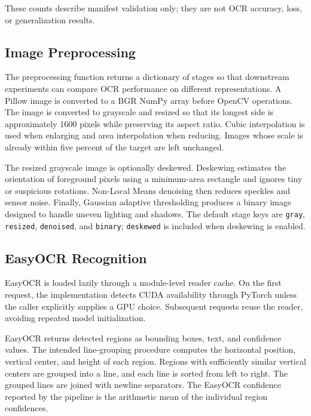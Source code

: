 \documentclass[conference]{IEEEtran}
\begin{document}
These counts describe manifest validation only; they are not OCR accuracy,
loss, or generalization results.

\subsection{Image Preprocessing}
\label{sec:preprocessing}

The preprocessing function returns a dictionary of stages so that downstream
experiments can compare OCR performance on different representations. A
Pillow image is converted to a BGR NumPy array before OpenCV operations.
The image is converted to grayscale and resized so that its longest side is
approximately 1600 pixels while preserving its aspect ratio. Cubic
interpolation is used when enlarging and area interpolation when reducing.
Images whose scale is already within five percent of the target are left
unchanged.

The resized grayscale image is optionally deskewed. Deskewing estimates the
orientation of foreground pixels using a minimum-area rectangle and ignores
tiny or suspicious rotations. Non-Local Means denoising then reduces speckles
and sensor noise. Finally, Gaussian adaptive thresholding produces a binary
image designed to handle uneven lighting and shadows. The default stage keys
are \texttt{gray}, \texttt{resized}, \texttt{denoised}, and \texttt{binary};
\texttt{deskewed} is included when deskewing is enabled.

\subsection{EasyOCR Recognition}
\label{sec:easyocr}

EasyOCR is loaded lazily through a module-level reader cache. On the first
request, the implementation detects CUDA availability through PyTorch unless
the caller explicitly supplies a GPU choice. Subsequent requests reuse the
reader, avoiding repeated model initialization.

EasyOCR returns detected regions as bounding boxes, text, and confidence
values. The intended line-grouping procedure computes the horizontal position,
vertical center, and height of each region. Regions with sufficiently similar
vertical centers are grouped into a line, and each line is sorted from left to
right. The grouped lines are joined with newline separators. The EasyOCR
confidence reported by the pipeline is the arithmetic mean of the individual
region confidences.
\end{document}
